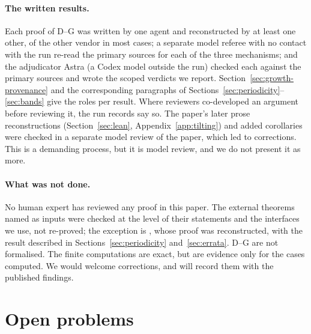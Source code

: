 \paragraph{The written results.}  Each proof of D--G was written by one agent and
reconstructed by at least one other, of the other vendor in most cases; a separate model
referee with no contact with the run re-read the primary sources for each of the three
mechanisms; and the adjudicator Astra (a Codex model outside the run) checked each against the
primary sources and wrote the scoped verdicts we report.  Section~\ref{sec:growth-provenance}
and the corresponding paragraphs of Sections~\ref{sec:periodicity}--\ref{sec:bands} give the
roles per result.  Where reviewers co-developed an argument before reviewing it, the run
records say so.  The paper's later prose reconstructions (Section~\ref{sec:lean},
Appendix~\ref{app:tilting}) and added corollaries were checked in a separate model review of
the paper, which led to corrections.  This is a demanding process, but it is model review,
and we do not present it as more.

\paragraph{What was not done.}  No human expert has reviewed any proof in this paper.  The
external theorems named as inputs were checked at the level of their statements and the
interfaces we use, not re-proved; the exception is \cite[Thm.~8.4.5]{hone2025}, whose proof
was reconstructed, with the result described in Sections~\ref{sec:periodicity}
and~\ref{sec:errata}.  D--G are not formalised.  The finite computations are
exact, but are evidence only for the cases computed.  We would welcome corrections, and will
record them with the published findings.

\section{Open problems}\label{sec:open}


